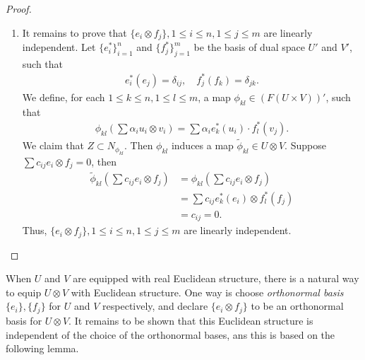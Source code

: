 \documentclass[11pt]{book}
\theoremstyle{definition}
\numberwithin{equation}{chapter}
\begin{document}
\begin{subappendices}
\begin{proof}
\begin{enumerate}[label=(\alph*)]
    \item It remains to prove that $\{e_i \otimes f_j\}, 1 \leq i \leq n, 1 \leq j \leq m$ are linearly independent. Let $\{e_i^*\}^n_{i=1}$ and $\{f_j^*\}^m_{j=1}$ be the basis of dual space $U'$ and $V'$, such that 
    \begin{align*}
        e_i^*(e_j) = \delta_{ij}, \quad f_j^*(f_k) = \delta_{jk}.
    \end{align*}
    We define, for each $1 \leq k \leq n, 1 \leq l \leq m$, a map $\phi_{kl} \in (F(U \times V))'$, such that
    \begin{align*}
        \phi_{kl} \left(\sum \alpha_{i} u_i \otimes v_i \right) = \sum \alpha_i e_k^*(u_i) \cdot f_l^*(v_j).
    \end{align*}
    We claim that $Z \subset N_{\phi_{kl}}$. Then $\phi_{kl}$ induces a map $\widetilde{\phi}_{kl} \in U \otimes V$. Suppose $\sum c_{ij} e_i \otimes f_j = 0$, then
    \begin{align*}
        \widetilde{\phi}_{kl} \left(\sum c_{ij} e_i \otimes f_j \right) & = \phi_{kl} \left(\sum c_{ij} e_i \otimes f_j \right) \\
        & =\sum c_{ij} e_k^*(e_i) \otimes f_l^*(f_j) \\
        & = c_{ij} = 0.
    \end{align*}
    Thus, $\{e_i \otimes f_j\}, 1 \leq i \leq n, 1 \leq j \leq m$ are linearly independent.
\end{enumerate}
\end{proof}

\medskip

When $U$ and $V$ are equipped with real Euclidean structure, there is a natural way to equip $U \otimes V$ with Euclidean structure. One way is choose {\em orthonormal basis} $\{e_i\}, \{f_j\}$  for $U$ and $V$ respectively, and declare $\{e_i \otimes f_j\}$ to be an orthonormal basis for $U \otimes V$.  It remains to be shown that this Euclidean structure is independent of the choice of the orthonormal bases, ans this is based on the following lemma.

\medskip


\end{subappendices}
\end{document}
